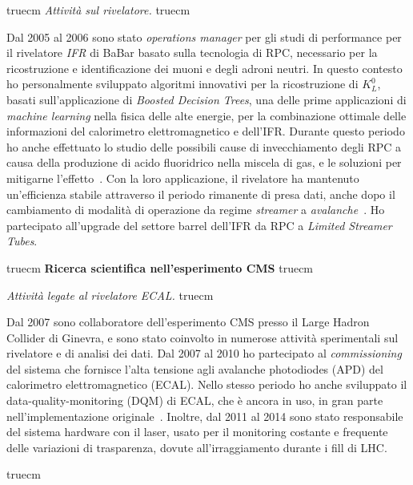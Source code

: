 \documentclass[11pt,twoside,a4paper]{article}
\begin{document}
 truecm
\textit{Attivit\`a sul rivelatore.}
 truecm

Dal 2005 al 2006 sono stato \textit{operations manager} per gli studi
di performance per il rivelatore \textit{IFR} di BaBar basato sulla
tecnologia di RPC, necessario per la ricostruzione e identificazione
dei muoni e degli adroni neutri. In questo contesto ho personalmente
sviluppato algoritmi innovativi per la ricostruzione di $K^0_L$,
basati sull'applicazione di \textit{Boosted Decision Trees}, una delle
prime applicazioni di \textit{machine learning} nella fisica delle
alte energie, per la combinazione ottimale delle informazioni del
calorimetro elettromagnetico e dell'IFR. Durante questo periodo ho
anche effettuato lo studio delle possibili cause di invecchiamento
degli RPC a causa della produzione di acido fluoridrico nella miscela
di gas, e le soluzioni per mitigarne
l'effetto~\cite{Band:2008zza}. Con la loro applicazione, il rivelatore
ha mantenuto un'efficienza stabile attraverso il periodo rimanente di
presa dati, anche dopo il cambiamento di modalit\`a di operazione da
regime \textit{streamer} a
\textit{avalanche}~\cite{Band:2006ig,Anulli:2005wi}. Ho partecipato
all'upgrade del settore barrel dell'IFR da RPC a \textit{Limited
  Streamer Tubes}.

 truecm
{\bf{Ricerca scientifica nell'esperimento CMS}}
 truecm

\textit{Attivit\`a legate al rivelatore ECAL.}
 truecm

Dal 2007 sono collaboratore dell'esperimento CMS presso il Large
Hadron Collider di Ginevra, e sono stato coinvolto in numerose
attivit\`a sperimentali sul rivelatore e di analisi dei dati. Dal 2007
al 2010 ho partecipato al \textit{commissioning} del sistema che
fornisce l'alta tensione agli avalanche photodiodes (APD) del
calorimetro elettromagnetico (ECAL). Nello stesso periodo ho anche
sviluppato il data-quality-monitoring (DQM) di ECAL, che \`e ancora in
uso, in gran parte nell'implementazione
originale~\cite{DiMarco:2009zz}. Inoltre, dal 2011 al 2014 sono stato
responsabile del sistema hardware con il laser, usato per il
monitoring costante e frequente delle variazioni di trasparenza,
dovute all'irraggiamento durante i fill di LHC.

 truecm
\end{document}
